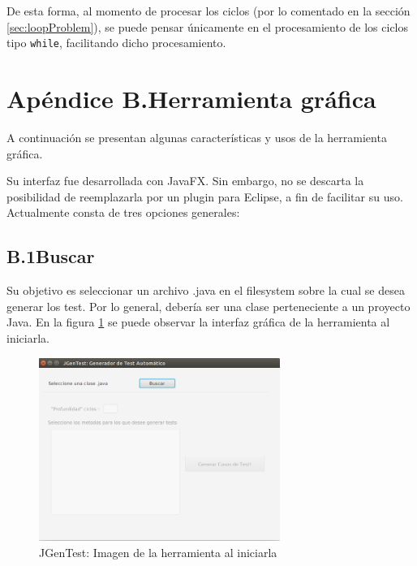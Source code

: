 \documentclass{llncs}
\begin{document}
De esta forma, al momento de procesar los ciclos (por lo comentado en la sección \ref{sec:loopProblem}), se puede pensar únicamente en el procesamiento de los ciclos tipo
\texttt{while}, facilitando dicho procesamiento.


\section*{Apéndice B.\enspace Herramienta gráfica}\label{apend.B}
A continuación se presentan algunas características y usos de la herramienta gráfica.

Su interfaz fue desarrollada con JavaFX. Sin embargo, no se descarta la posibilidad de reemplazarla por un plugin para Eclipse, a fin de facilitar su uso.
Actualmente consta de tres opciones generales:

    \subsection*{B.1\enspace Buscar}
    Su objetivo es seleccionar un archivo .java en el filesystem sobre la cual se desea generar los test. Por lo general, debería ser una clase perteneciente a un proyecto
    Java. En la figura \ref{fig:buscarClaseJava} se puede observar la interfaz gráfica de la herramienta al iniciarla.
    \begin{figure}
    \centering
    \includegraphics[width=0.7\textwidth]{screenshots/1-inicial}
    \caption{JGenTest: Imagen de la herramienta al iniciarla}
    \label{fig:buscarClaseJava}
    \end{figure}
\end{document}
